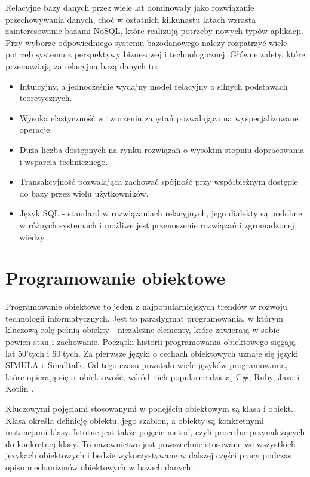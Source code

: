 \documentclass[a4paper,twoside,12pt]{book}
\begin{document}
Relacyjne bazy danych przez wiele lat dominowały jako rozwiązanie przechowywania danych, choć w ostatnich kilkunastu latach wzrasta zainteresowanie bazami NoSQL, które realizują potrzeby nowych typów aplikacji. Przy wyborze odpowiedniego systemu bazodanowego należy rozpatrzyć wiele potrzeb systemu z perspektywy biznesowej i technologicznej. Główne zalety, które przemawiają za relacyjną bazą danych to:
\begin{itemize}
    \item Intuicyjny, a jednocześnie wydajny model relacyjny o silnych podstawach teoretycznych.
    \item Wysoka elastyczność w tworzeniu zapytań pozwalająca na wyspecjalizowane operacje.
    \item Duża liczba dostępnych na rynku rozwiązań o wysokim stopniu dopracowania i wsparcia technicznego.
    \item Transakcyjność pozwalająca zachować spójność przy współbieżnym dostępie do bazy przez wielu użytkowników.
    \item Język SQL - standard w rozwiązaniach relacyjnych, jego dialekty są podobne w różnych systemach i możliwe jest przenoszenie rozwiązań i zgromadzonej wiedzy.
\end{itemize}

\section{Programowanie obiektowe}

Programowanie obiektowe to jeden z najpopularniejszych trendów w rozwoju technologii informatycznych. Jest to paradygmat programowania, w którym kluczową rolę pełnią obiekty - niezależne elementy, które zawierają w sobie pewien stan i zachowanie. Początki historii programowania obiektowego sięgają lat 50'tych i 60'tych. Za pierwsze języki o cechach obiektowych uznaje się języki SIMULA i~Smalltalk. Od tego czasu powstało wiele języków programowania, które opierają się o~obiektowość, wśród nich popularne dzisiaj C\#, Ruby, Java i Kotlin \cite{bib:metody-obiektowe-w-teroii-i-praktyce}.

Kluczowymi pojęciami stosowanymi w podejściu obiektowym są klasa i obiekt. Klasa określa definicję obiektu, jego szablon, a obiekty są konkretnymi instancjami klasy. Istotne jest także pojęcie metod, czyli procedur przynależących do konkretnej klasy. To nazewnictwo jest powszechnie stosowane we wszystkich językach obiektowych i będzie wykorzystywane w dalszej części pracy podczas opisu mechanizmów obiektowych w bazach danych.    
\end{document}
